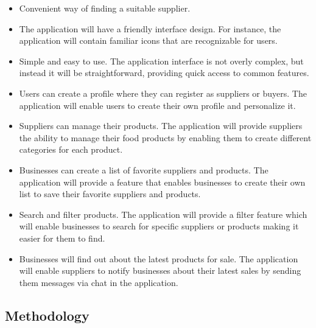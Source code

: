 \documentclass[11pt]{article}
\begin{document}
\begin{itemize}

\item Convenient way of finding a suitable supplier.

\item The application will have a friendly interface design. For instance, the application will contain familiar icons that are recognizable for users. 


\item Simple and easy to use. The application interface is not overly complex, but instead it will be straightforward, providing quick access to common features.


\item Users can create a profile where they can register as suppliers or buyers. The application will enable users to create their own profile and personalize it.
 
\item Suppliers can manage their products. The application will provide suppliers the ability to manage their food products by enabling them to create different categories for each product.

\item Businesses can create a list of favorite suppliers and products. The application will provide a feature that enables businesses to create their own list to save their favorite suppliers and products.
\item Search and filter products. The application will provide a filter feature which will enable businesses to search for specific suppliers or products making it easier for them to find. 

\item Businesses will find out about the latest products for sale. The application will enable suppliers to notify businesses about their latest sales by sending them messages via chat in the application. 

\end{itemize}
\newpage
\begin{center}
\section{Methodology}
\end{center}
\end{document}
